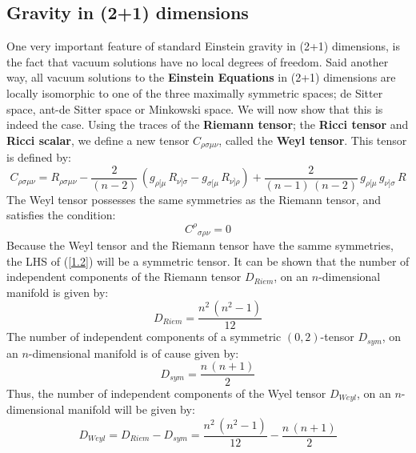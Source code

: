 


\subsection{Gravity in (2+1) dimensions}
One very important feature of standard Einstein gravity in (2+1) dimensions, is the fact that vacuum solutions have no local degrees of freedom. Said another way, all vacuum solutions to the \textbf{Einstein Equations} in (2+1) dimensions are locally isomorphic to one of the three maximally symmetric spaces; de Sitter space, ant-de Sitter space or Minkowski space. We will now show that this is indeed the case. Using the traces of the \textbf{Riemann tensor}; the \textbf{Ricci tensor} and \textbf{Ricci scalar}, we define a new tensor $C_{\rho\sigma\mu\nu}$, called the \textbf{Weyl tensor}. This tensor is defined by:
%
%
\begin{equation}\label{1.1}
C_{\rho\sigma\mu\nu} = R_{\rho\sigma\mu\nu}
- \frac{2}{(n-2)} \, (g_{\rho[\mu} \, R_{\nu]\sigma} - g_{\sigma[\mu} \, R_{\nu]\rho})
+ \frac{2}{(n-1) \, (n-2)} \, g_{\rho[\mu} \, g_{\nu]\sigma} \, R
\end{equation}
%
%
The Weyl tensor possesses the same symmetries as the Riemann tensor, and satisfies the condition:
%
%
\begin{equation}\label{1.2}
{C^{\rho}}_{\sigma\rho\nu} = 0
\end{equation}
%
%
Because the Weyl tensor and the Riemann tensor have the samme symmetries, the LHS of (\ref{1.2}) will be a symmetric tensor. It can be shown that the number of independent components of the Riemann tensor $D_{Riem}$, on an $n$-dimensional manifold is given by:
%
%
\begin{equation}
D_{Riem} = \frac{n^2 \, (n^2 - 1)}{12}
\end{equation}
%
%
The number of independent components of a symmetric $(0,2)$-tensor $D_{sym}$, on an $n$-dimensional manifold is of cause given by:
%
%
\begin{equation}
D_{sym} = \frac{n \, (n + 1)}{2}
\end{equation}
%
%
Thus, the number of independent components of the Wyel tensor $D_{Weyl}$, on an $n$-dimensional manifold will be given by:
%
%
\begin{equation}
D_{Weyl} = D_{Riem} - D_{sym} = \frac{n^2 \, (n^2 - 1)}{12} - \frac{n \, (n + 1)}{2}
\end{equation}
